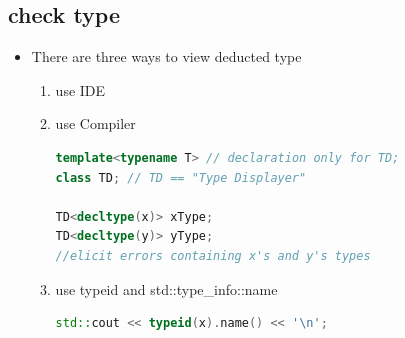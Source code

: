 \documentclass[a4paper,11pt,twoside]{book}
\begin{document}
\subsection{check type}

\begin{itemize}
	\item There are three ways to view deducted type
	\begin{enumerate}
		\item use IDE
		\item use Compiler
\begin{lstlisting}[frame=single, language=c++]
template<typename T> // declaration only for TD;
class TD; // TD == "Type Displayer"

TD<decltype(x)> xType; 
TD<decltype(y)> yType; 
//elicit errors containing x's and y's types
\end{lstlisting}

	\item use typeid and std::type\_info::name
	
\begin{lstlisting}[frame=single, language=c++]
std::cout << typeid(x).name() << '\n'; 
\end{lstlisting}
		
	\end{enumerate}
	
\end{itemize}
\end{document}
